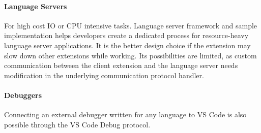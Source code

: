 \paragraph{Language Servers} For high cost IO or CPU intensive tasks.
Language server framework and sample implementation helps developers create a dedicated process for resource-heavy language server applications. It is the better design choice if the extension may slow down other extensions while working. Its possibilities are limited, as custom communication between the client extension and the language server needs modification in the underlying communication protocol handler.

\paragraph{Debuggers} Connecting an external debugger written for any language to VS Code is also possible through the VS Code Debug protocol.
